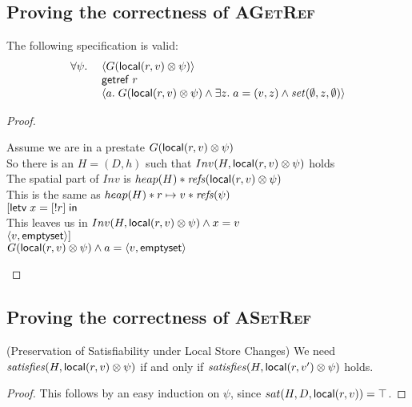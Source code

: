 \subsection{Proving the correctness of \textsc{AGetRef}}
\begin{prop*}
The following specification is valid: 
\begin{displaymath}
\begin{array}{ll}
    \forall \psi.\; 
    &  \left<G(\mathsf{local}({r}, {v}) \otimes \psi)\right> \\
    &  \mathsf{getref}\; r \\
    &  \left<a.\; G(\mathsf{local}({r}, {v}) \otimes \psi) 
                  \land  \exists z.\;a = (v,z) \land \mathit{set}(\emptyset, z, \emptyset)
       \right> \\
     \end{array}
\end{displaymath}
\end{prop*}
\begin{proof}
\begin{tabbedproof}
\oo Assume we are in a prestate $G(\mathsf{local}({r}, {v}) \otimes \psi)$ \\
\oo So there is an $H = (D,h)$ such that $Inv(H, \mathsf{local}({r}, {v}) \otimes \psi)$ holds \\
\oo The spatial part of $Inv$ is $heap(H) * \mathit{refs}(\mathsf{local}({r}, {v}) \otimes \psi)$ \\
\oo This is the same as $heap(H) * {r}\mapsto{v} * \mathit{refs}(\psi)$ \\
\oo $[\mathsf{letv}\;x = [!r]\;\mathsf{in}\;$ \\
\oo This leaves us in $Inv(H, \mathsf{local}({r}, {v}) \otimes \psi) \land x = v$ \\
\oo $\left<{v},{\mathsf{emptyset}}\right>]$ \\
\oo $G(\mathsf{local}({r}, {v}) \otimes \psi) \land a = \left<{v},{\mathsf{emptyset}}\right>$ \\
\end{tabbedproof}
\end{proof}

\subsection{Proving the correctness of \textsc{ASetRef}}

\begin{lemma}{(Preservation of Satisfiability under Local Store Changes)}
We need $\mathit{satisfies}({H}, {\mathsf{local}({r}, {v}) \otimes \psi})$ if and only if $\mathit{satisfies}({H}, {\mathsf{local}({r}, {v'}) \otimes \psi})$ holds.
\end{lemma}
\begin{proof}
This follows by an easy induction on $\psi$, since $sat(H, D, \mathsf{local}({r}, {v})) = \top$. 
\end{proof}

